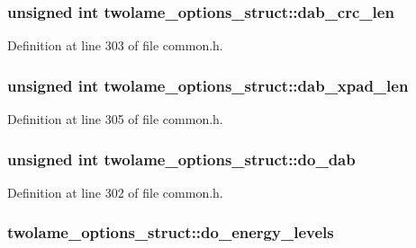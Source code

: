 \subsubsection[{\texorpdfstring{dab\+\_\+crc\+\_\+len}{dab_crc_len}}]{\setlength{\rightskip}{0pt plus 5cm}unsigned {\bf int} twolame\+\_\+options\+\_\+struct\+::dab\+\_\+crc\+\_\+len}\hypertarget{structtwolame__options__struct_ac1cd33eef92847da1ee8dd621d6653b7}{}\label{structtwolame__options__struct_ac1cd33eef92847da1ee8dd621d6653b7}


Definition at line 303 of file common.\+h.

\subsubsection[{\texorpdfstring{dab\+\_\+xpad\+\_\+len}{dab_xpad_len}}]{\setlength{\rightskip}{0pt plus 5cm}unsigned {\bf int} twolame\+\_\+options\+\_\+struct\+::dab\+\_\+xpad\+\_\+len}\hypertarget{structtwolame__options__struct_a147c3606710121464bc693a21b43abba}{}\label{structtwolame__options__struct_a147c3606710121464bc693a21b43abba}


Definition at line 305 of file common.\+h.

\subsubsection[{\texorpdfstring{do\+\_\+dab}{do_dab}}]{\setlength{\rightskip}{0pt plus 5cm}unsigned {\bf int} twolame\+\_\+options\+\_\+struct\+::do\+\_\+dab}\hypertarget{structtwolame__options__struct_ab1ccaeda99cf029d6e6ab4477efde9a8}{}\label{structtwolame__options__struct_ab1ccaeda99cf029d6e6ab4477efde9a8}


Definition at line 302 of file common.\+h.

\subsubsection[{\texorpdfstring{do\+\_\+energy\+\_\+levels}{do_energy_levels}}]{ twolame\+\_\+options\+\_\+struct\+::do\+\_\+energy\+\_\+levels}\hypertarget{structtwolame__options__struct_a404e8d457ac5ba63be0144540ce035a9}{}\label{structtwolame__options__struct_a404e8d457ac5ba63be0144540ce035a9}


